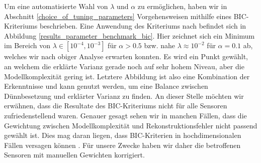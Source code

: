 Um eine automatisierte Wahl von $\lambda$ und $\alpha$ zu ermöglichen, haben wir in Abschnitt \ref{choice_of_tuning_parameters} Vorgehensweisen mithilfe eines BIC-Kriteriums beschrieben. Eine Anwendung des Kriteriums nach \cite{croux, guo} befindet sich in Abbildung \ref{results_parameter_benchmark_bic}. Hier zeichnet sich ein Minimum im Bereich von $\lambda \in [10^{-4}, 10^{-3}]$ für $\alpha > 0.5$ bzw. nahe $\lambda \approx 10^{-2}$ für $\alpha = 0.1$ ab, welches wir nach obiger Analyse erwarten konnten. Es wird ein Punkt gewählt, an welchem die erklärte Varianz gerade noch auf sehr hohem Niveau, aber die Modellkomplexität gering ist. Letztere Abbildung ist also eine Kombination der Erkenntnisse und kann genutzt werden, um eine Balance zwischen Dünnbesetzung und erklärter Varianz zu finden. An dieser Stelle möchten wir erwähnen, dass die Resultate des BIC-Kriteriums nicht für alle Sensoren zufriedenstellend waren. Genauer gesagt sehen wir in manchen Fällen, dass die Gewichtung zwischen Modellkomplexität und Rekonstruktionsfehler nicht passend gewählt ist. Dies mag daran liegen, dass BIC-Kriterien in hochdimensionalen Fällen versagen können \cite{giraud}. Für unsere Zwecke haben wir daher die betroffenen Sensoren mit manuellen Gewichten korrigiert.

